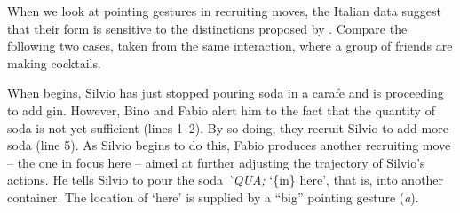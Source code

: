 \documentclass[output=paper,modfonts]{langscibook}
\begin{document}
When we look at pointing gestures in recruiting moves, the Italian data suggest that their form is sensitive to the distinctions proposed by \citet{EnfieldKitaRuiter2007}. Compare the following two cases, taken from the same interaction, where a group of friends are making cocktails. 

When  begins, Silvio has just stopped pouring soda in a carafe and is proceeding to add gin. However, Bino and Fabio alert him to the fact that the quantity of soda is not yet sufficient (lines 1--2). By so doing, they recruit Silvio to add more soda (line 5). As Silvio begins to do this, Fabio produces another recruiting move -- the one in focus here -- aimed at further adjusting the trajectory of Silvio's actions. He tells Silvio to pour the soda \textit{\`{}QUA;} ‘\{in\} here’, that is, into another container. The location of ‘here’ is supplied by a “big” pointing gesture (\textit{a}). %
\end{document}
